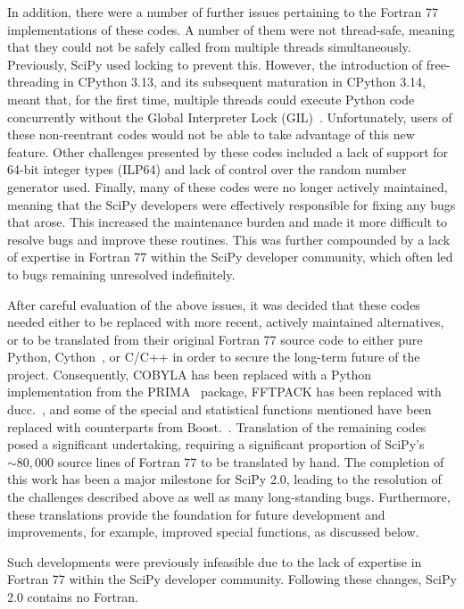 \documentclass[acmsmall]{acmart}
\newcommand{\jake}[1]{\todo[inline, backgroundcolor=green!20!white]{Jake:~#1}}
\begin{document}
In addition, there were a number of further issues pertaining to the Fortran 77
implementations of these codes. A number of them were not thread-safe,
meaning that they could not be safely called from multiple threads simultaneously.
Previously, SciPy used locking to prevent this. However, the introduction of
free-threading in CPython 3.13, and its subsequent maturation in CPython 3.14, meant
that, for the first time, multiple threads could execute Python code concurrently
without the Global Interpreter Lock (GIL)~\cite{gross2023pep703}. Unfortunately,
users of these non-reentrant codes would not be able to take advantage of this
new feature.
Other challenges presented by these codes included a lack of support for
64-bit integer types (ILP64) and lack of control over the random number generator used.
Finally, many of these codes were no longer actively maintained, meaning that the
SciPy developers were effectively responsible for fixing any bugs that arose.
This increased the maintenance burden and made it more difficult to resolve bugs and
improve these routines. This was further compounded by a lack of expertise in Fortran
77 within the SciPy developer community, which often led to bugs remaining unresolved
indefinitely.

After careful evaluation of the above issues, it was decided that these
codes needed either to be replaced with
more recent, actively maintained alternatives, or to be translated from their
original Fortran 77 source code to either pure Python,
Cython~\cite{Behnel2011}, or C/C++ in order to secure the long-term future of the
project. Consequently, COBYLA has been replaced with
a Python implementation from the PRIMA~\cite{Zhang_2023} package, FFTPACK has been replaced with
ducc.\@fft~\cite{reinecke2019ducc}, and some of the special and statistical functions
mentioned have been replaced with counterparts from Boost.\@Math~\cite{boostmath}. Translation of the remaining
codes posed a significant undertaking, requiring a significant proportion of SciPy's
$\sim80{,}000$ source lines of Fortran 77 to be translated by hand. The completion of this work has been a major milestone for
SciPy 2.0, leading to the resolution of the challenges described above as well as many
long-standing bugs. Furthermore, these translations provide the foundation for
future development and improvements, for example, improved special functions, as
discussed below.

\jake{Add a forward reference to the relevant section.}

Such developments were previously infeasible
due to the lack of expertise in Fortran 77 within the SciPy developer community.
Following these changes, SciPy 2.0 contains no Fortran.
\end{document}
